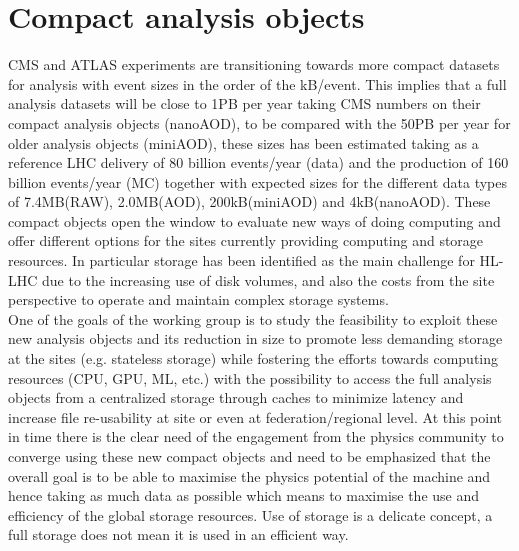 \section{Compact analysis objects}
CMS and ATLAS experiments are transitioning towards more compact datasets for analysis with event sizes in the order of the kB/event. This implies that a full analysis datasets will be close to 1PB per year taking CMS numbers on their compact analysis objects (nanoAOD), to be compared with the 50PB per year for older analysis objects (miniAOD), these sizes has been estimated taking as a reference LHC delivery of 80 billion events/year (data) and the production of 160 billion events/year (MC) together with expected sizes for the different data types of 7.4MB(RAW), 2.0MB(AOD), 200kB(miniAOD) and 4kB(nanoAOD). These compact objects open the window to evaluate new ways of doing computing and offer different options for the sites currently providing computing and storage resources. In particular storage has been identified as the main challenge for HL-LHC due to the increasing use of disk volumes, and also the costs from the site perspective to operate and maintain complex storage systems.\\
One of the goals of the working group is to study the feasibility to exploit these new analysis objects and its reduction in size to promote less demanding storage at the sites (e.g. stateless storage) while fostering the efforts towards computing resources (CPU, GPU, ML, etc.) with the possibility to access the full analysis objects from a centralized storage through caches to minimize latency and increase file re-usability at site or even at federation/regional level. At this point in time there is the clear need of the engagement from the physics community to converge using these new compact objects and need to be emphasized that the overall goal is to be able to maximise the physics potential of the machine and hence taking as much data as possible which means to maximise the use and efficiency of the global storage resources. Use of storage is a delicate concept, a full storage does not mean it is used in an efficient way.\\
